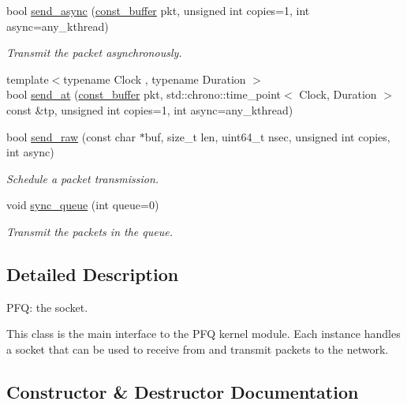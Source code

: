 \begin{DoxyCompactItemize}
bool \hyperlink{classpfq_1_1socket_a7aabeecfa3112bc2b2fa54ac6a59357a}{send\+\_\+async} (\hyperlink{namespacepfq_ac835a1bd09b4cbaba61c100b50d0a99f}{const\+\_\+buffer} pkt, unsigned int copies=1, int async=any\+\_\+kthread)
\begin{DoxyCompactList}\small\item\em Transmit the packet asynchronously. \end{DoxyCompactList}\item 
{\footnotesize template$<$typename Clock , typename Duration $>$ }\\bool \hyperlink{classpfq_1_1socket_aeaaf63387599e9bb3d7d03258f125513}{send\+\_\+at} (\hyperlink{namespacepfq_ac835a1bd09b4cbaba61c100b50d0a99f}{const\+\_\+buffer} pkt, std\+::chrono\+::time\+\_\+point$<$ Clock, Duration $>$ const \&tp, unsigned int copies=1, int async=any\+\_\+kthread)
\item 
bool \hyperlink{classpfq_1_1socket_a32bc4849b022ac9c0e8b3a7d44985bc2}{send\+\_\+raw} (const char $\ast$buf, size\+\_\+t len, uint64\+\_\+t nsec, unsigned int copies, int async)
\begin{DoxyCompactList}\small\item\em Schedule a packet transmission. \end{DoxyCompactList}\item 
void \hyperlink{classpfq_1_1socket_ab1739b5779cb85f3e7669883af892828}{sync\+\_\+queue} (int queue=0)
\begin{DoxyCompactList}\small\item\em Transmit the packets in the queue. \end{DoxyCompactList}\end{DoxyCompactItemize}


\subsection{Detailed Description}
P\+FQ\+: the socket. 

This class is the main interface to the P\+FQ kernel module. Each instance handles a socket that can be used to receive from and transmit packets to the network. 

\subsection{Constructor \& Destructor Documentation}
\mbox{\label{classpfq_1_1socket_a169a46cd01a5fd0a71919ece48f18d9d}} 
